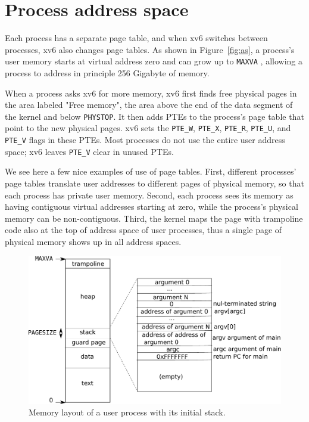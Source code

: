 \section{Process address space}

Each process has a separate page table, and when xv6 switches between
processes, xv6 also changes page tables.
As shown in
Figure~\ref{fig:as},
a process's user memory starts at virtual address
zero and can grow up to
\texttt{MAXVA}
,
allowing a process to address in principle 256 Gigabyte of memory.

When a process asks xv6 for more memory,
xv6 first finds free physical pages in the area
labeled "Free memory", the area above the end of the data segment
of the kernel and below
\texttt{PHYSTOP}.
It then adds PTEs to the process's page table that point
to the new physical pages.
xv6 sets the
\lstinline{PTE_W},
\lstinline{PTE_X},
\lstinline{PTE_R},
\lstinline{PTE_U},
and
\lstinline{PTE_V}
flags in these PTEs.
Most processes do not use the entire user address space;
xv6 leaves
\lstinline{PTE_V}
clear in unused PTEs.

We see here a few nice examples of use of page tables.  First,
different processes' page tables translate user addresses to different
pages of physical memory, so that each process has private user
memory.  Second, each process sees its memory as having contiguous
virtual addresses starting at zero, while the process's physical
memory can be non-contiguous.  Third, the kernel maps the page with
trampoline code also at the top of address space of user processes,
thus a single page of physical memory shows up in all address spaces.

\begin{figure}[t]
\center
\includegraphics[scale=0.5]{fig/processlayout.pdf}
\caption{Memory layout of a user process with its initial stack.}
\label{fig:processlayout}
\end{figure}

